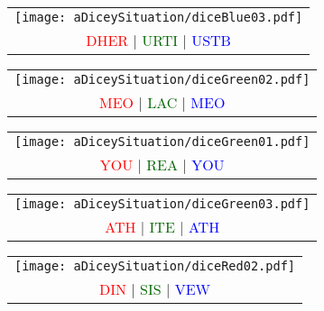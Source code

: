 \begin{puzzle}
  \vfill


  \begin{center}
    \begin{tabular}{c}
      \texttt{[image: aDiceySituation/diceBlue03.pdf]}
      \\
      \textcolor{red}{DHER} |
      \textcolor{darkGreen}{URTI} |
      \textcolor{blue}{USTB}
    \end{tabular}
  \end{center}


  \newpage


  \begin{center}
    \begin{tabular}{c}
      \texttt{[image: aDiceySituation/diceGreen02.pdf]}
      \\
      \textcolor{red}{MEO} |
      \textcolor{darkGreen}{LAC} |
      \textcolor{blue}{MEO}
    \end{tabular}
  \end{center}


  \vfill


  \begin{center}
    \begin{tabular}{c}
      \texttt{[image: aDiceySituation/diceGreen01.pdf]}
      \\
      \textcolor{red}{YOU} |
      \textcolor{darkGreen}{REA} |
      \textcolor{blue}{YOU}
    \end{tabular}
  \end{center}


  \vfill


  \begin{center}
    \begin{tabular}{c}
      \texttt{[image: aDiceySituation/diceGreen03.pdf]}
      \\
      \textcolor{red}{ATH} |
      \textcolor{darkGreen}{ITE} |
      \textcolor{blue}{ATH}
    \end{tabular}
  \end{center}


  \newpage


  \begin{center}
    \begin{tabular}{c}
      \texttt{[image: aDiceySituation/diceRed02.pdf]}
      \\
      \textcolor{red}{DIN} |
      \textcolor{darkGreen}{SIS} |
      \textcolor{blue}{VEW}
    \end{tabular}
  \end{center}



\end{puzzle}
